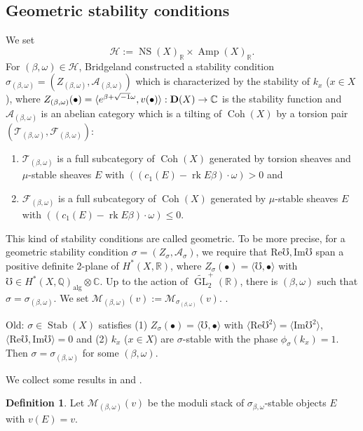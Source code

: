 \documentclass[10pt]{amsart}
\def\cal{\mathcal}
\def\Bbb{\mathbb}
\newenvironment{NB}{
\color{red}{\bf NB}. \footnotesize 
}{}
\newcommand{\GL}  {\operatorname{GL}}
\newcommand{\Coh}{\operatorname{Coh}}
\newcommand{\rk}{\operatorname{rk}}
\newcommand{\NS}{\operatorname{NS}}
\newcommand{\Amp}{\operatorname{Amp}}
\newcommand{\alg}{\operatorname{alg}}
\newcommand{\Stab}{\operatorname{Stab}}
\numberwithin{equation}{section}
\theoremstyle{plain}
\theoremstyle{definition}
\newtheorem{defn}[thm]{Definition}
\theoremstyle{remark}
\begin{document}
\subsection{Geometric stability conditions}
We set
$$
{\cal H}:=\NS(X)_{\Bbb R} \times \Amp(X)_{\Bbb R}.
$$
For $(\beta,\omega) \in {\cal H}$,
Bridgeland \cite{Br:3} constructed a stability condition
$\sigma_{(\beta,\omega)}=(Z_{(\beta,\omega)},{\cal A}_{(\beta,\omega)})$
which is characterized
by the stability of $k_x$ ($x \in X$), where
$Z_{(\beta,\omega)}(\bullet)=
\langle e^{\beta+\sqrt{-1}\omega},v(\bullet) \rangle:
{\bf D}(X) \to {\Bbb C}$ is the stability function and
${\cal A}_{(\beta,\omega)}$ 
is an abelian category which is a tilting of $\Coh(X)$
by a torsion pair $({\cal T}_{(\beta,\omega)},{\cal F}_{(\beta,\omega)})$:
\begin{enumerate}
\item
${\cal T}_{(\beta,\omega)}$ is a full subcategory of $\Coh(X)$ generated by
torsion sheaves and $\mu$-stable sheaves $E$ with 
$((c_1(E)-\rk E \beta) \cdot \omega)>0$ and
\item
${\cal F}_{(\beta,\omega)}$ is a full subcategory of $\Coh(X)$ generated by
$\mu$-stable sheaves $E$ with 
$((c_1(E)-\rk E \beta) \cdot \omega) \leq 0$.
\end{enumerate}
This kind of stability conditions are called geometric.
To be more precise,
for a geometric stability condition
$\sigma=(Z_\sigma,{\cal A}_\sigma)$,
we require that
$\mathrm{Re}\mho, \mathrm{Im}\mho$ span a positive definite
2-plane of $H^*(X,{\Bbb R})$,
where $Z_\sigma(\bullet)=\langle \mho,\bullet \rangle$
with $\mho \in H^*(X,{\Bbb Q})_{\alg} \otimes {\Bbb C}$. 
Up to the action of $\widetilde{\GL}_2^+({\Bbb R})$, 
there is $(\beta,\omega)$ such that
$\sigma=\sigma_{(\beta,\omega)}$.
We set ${\cal M}_{(\beta,\omega)}(v):=
{\cal M}_{\sigma_{(\beta,\omega)}}(v)$.
\begin{NB}
Old:
$\sigma \in \Stab(X)$ satisfies  
(1)
$Z_\sigma(\bullet)=\langle \mho,\bullet \rangle$
with $\langle \mathrm{Re}\mho^2 \rangle=
\langle \mathrm{Im}\mho^2 \rangle$, 
$\langle \mathrm{Re}\mho,\mathrm{Im}\mho \rangle=0$
and
(2)
$k_x$ ($x \in X$) are $\sigma$-stable
with the phase $\phi_{\sigma}(k_x)=1$. Then
$\sigma=\sigma_{(\beta,\omega)}$ for some $(\beta,\omega)$.
\end{NB}



We collect some results in \cite{YY2} and \cite{Y}.

\begin{defn}\label{defm:moduli}
Let ${\cal M}_{(\beta,\omega)}(v)$ be the moduli stack of
$\sigma_{\beta,\omega}$-stable objects $E$ with $v(E)=v$. 
\end{defn}
\end{document}
